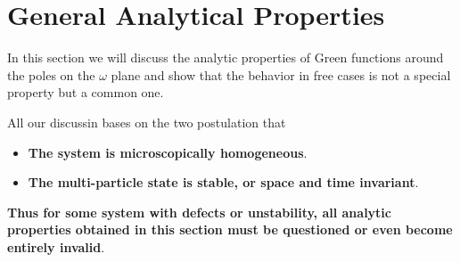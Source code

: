 \documentclass[b5paper,10pt,UTF8]{book}
\numberwithin{equation}{section}
\begin{document}
	\section{General Analytical Properties}
		In this section we will discuss the analytic properties of Green functions around the poles on the $\omega$ plane and show that the behavior in free cases is not a special property but a common one.\par
		All our discussin bases on the two postulation that 
		\begin{itemize}
			\item \textbf{The system is microscopically homogeneous}.
			\item \textbf{The multi-particle state is stable, or space and time invariant}.
		\end{itemize}
		\textbf{Thus for some system with defects or unstability, all analytic properties obtained in this section must be questioned or even become entirely invalid}.\par
		
\end{document}
